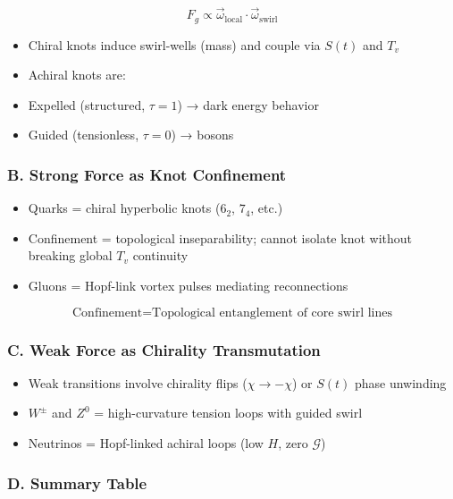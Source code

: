 \[
F_g \propto \vec{\omega}_{\text{local}} \cdot \vec{\omega}_{\text{swirl}}
\]

\begin{itemize}
    \item Chiral knots induce swirl-wells (mass) and couple via $S(t)$ and $T_v$
    \item Achiral knots are:
    \item Expelled (structured, $\tau=1$) → dark energy behavior
    \item Guided (tensionless, $\tau=0$) → bosons
\end{itemize}

\subsubsection*{B. Strong Force as Knot Confinement}

\begin{itemize}
    \item Quarks = chiral hyperbolic knots ($6_2$, $7_4$, etc.)
    \item Confinement = topological inseparability; cannot isolate knot without breaking global $T_v$ continuity
    \item Gluons = Hopf-link vortex pulses mediating reconnections
\end{itemize}

\[
\text{Confinement} = \text{Topological entanglement of core swirl lines}
\]

\subsubsection*{C. Weak Force as Chirality Transmutation}

\begin{itemize}
    \item Weak transitions involve chirality flips ($\chi \to -\chi$) or $S(t)$ phase unwinding
    \item $W^\pm$ and $Z^0$ = high-curvature tension loops with guided swirl
    \item Neutrinos = Hopf-linked achiral loops (low $H$, zero $\mathcal{G}$)
\end{itemize}

\subsubsection*{D. Summary Table}

